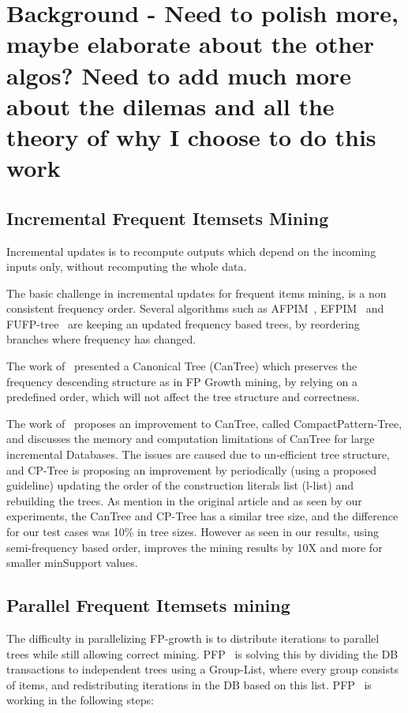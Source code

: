 \section{Background - Need to polish more, maybe elaborate about the other algos? Need to add much more about the dilemas and all the theory of why I choose to do this work}

\subsection{Incremental Frequent Itemsets Mining}
Incremental updates is to recompute outputs which depend on the incoming inputs only, without recomputing the whole data.

The basic challenge in incremental updates for frequent items mining, is a non consistent frequency order. Several algorithms such as AFPIM~\cite{koh2004efficient}, EFPIM~\cite{li2006fast} and FUFP-tree~\cite{hong2008incrementally} are keeping an updated frequency based trees, by reordering branches where frequency has changed.

The work of~\cite{leung2005cantree} presented a Canonical Tree (CanTree) which preserves the frequency descending structure as in FP Growth mining, by relying on a predefined order, which will not affect the tree structure and correctness.

	The work of~\cite{tanbeer2009efficient} proposes an improvement to CanTree, called CompactPattern-Tree, and discusses the memory and computation limitations of CanTree for large incremental Databases. The issues are caused due to un-efficient tree structure, and CP-Tree is proposing an improvement by periodically (using a proposed guideline) updating the order of the construction literals list (l-list) and rebuilding the trees. As mention in the original article and as seen by our experiments, the CanTree and CP-Tree has a similar tree size, and the difference for our test cases was 10\% in tree sizes. However as seen in our results, using semi-frequency based order, improves the mining results by 10X and more for smaller minSupport values.
	
	

\subsection{Parallel Frequent Itemsets mining}
The difficulty in parallelizing FP-growth is to distribute iterations to parallel trees while still allowing correct mining. PFP~\cite{li2008pfp} is solving this by dividing the DB transactions to independent trees using a Group-List, where every group consists of items, and redistributing iterations in the DB based on this list.
PFP~\cite{li2008pfp} is working in the following steps:

